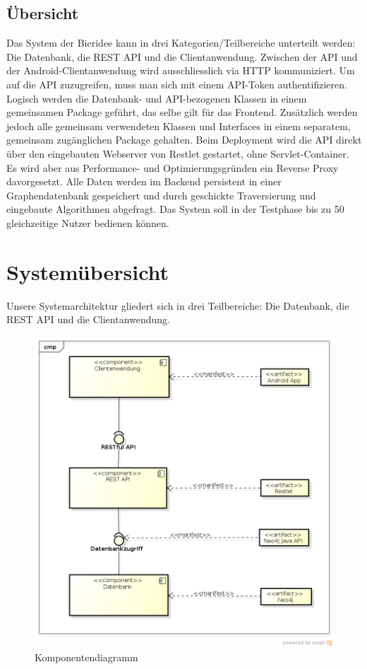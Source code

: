 \documentclass[10pt,a4paper]{scrartcl}
\begin{document}
%
%

\subsection{Übersicht}

Das System der Bieridee kann in drei Kategorien/Teilbereiche unterteilt werden: Die Datenbank, die
REST API und die Clientanwendung. Zwischen der API und der Android-Clientanwendung wird
ausschliesslich via HTTP kommuniziert. Um auf die API zuzugreifen, muss man sich mit einem API-Token
authentifizieren. Logisch werden die Datenbank- und API-bezogenen Klassen in einem gemeinsamen
Package geführt, das selbe gilt für das Frontend. Zusätzlich werden jedoch alle gemeinsam
verwendeten Klassen und Interfaces in einem separatem, gemeinsam zugänglichen Package gehalten.
Beim Deployment wird die API direkt über den eingebauten Webserver von Restlet gestartet, ohne
Servlet-Container. Es wird aber aus Performance- und Optimierungsgründen ein Reverse Proxy
davorgesetzt. Alle Daten werden im Backend persistent in einer Graphendatenbank gespeichert und
durch geschickte Traversierung und eingebaute Algorithmen abgefragt. Das System soll in der
Testphase bis zu 50 gleichzeitige Nutzer bedienen können.


\section{Systemübersicht}
Unsere Systemarchitektur gliedert sich in drei Teilbereiche: Die Datenbank, die REST API
und die Clientanwendung.

\begin{figure}[H]
	\includegraphics[width=\textwidth]{ComponentDiagram.png}
	\caption{Komponentendiagramm}
	\label{fig:component_diagram}
\end{figure}
\end{document}
